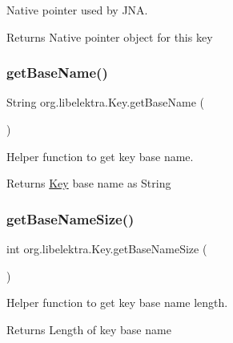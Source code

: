 Native pointer used by J\+NA. 

\begin{DoxyReturn}{Returns}
Native pointer object for this key 
\end{DoxyReturn}
\mbox{\label{classorg_1_1libelektra_1_1Key_a32c556682f808bbc0a4b676879f6b86f}} 
\subsubsection{\texorpdfstring{getBaseName()}{getBaseName()}}
{\footnotesize\ttfamily String org.\+libelektra.\+Key.\+get\+Base\+Name (\begin{DoxyParamCaption}{ }\end{DoxyParamCaption})\hspace{0.3cm}{\ttfamily [inline]}}



Helper function to get key base name. 

\begin{DoxyReturn}{Returns}
\mbox{\hyperlink{classorg_1_1libelektra_1_1Key}{Key}} base name as String 
\end{DoxyReturn}
\mbox{\label{classorg_1_1libelektra_1_1Key_a24bd83bcae08b956150d8ae3dafe738e}} 
\subsubsection{\texorpdfstring{getBaseNameSize()}{getBaseNameSize()}}
{\footnotesize\ttfamily int org.\+libelektra.\+Key.\+get\+Base\+Name\+Size (\begin{DoxyParamCaption}{ }\end{DoxyParamCaption})\hspace{0.3cm}{\ttfamily [inline]}}



Helper function to get key base name length. 

\begin{DoxyReturn}{Returns}
Length of key base name 
\end{DoxyReturn}
\mbox{\label{classorg_1_1libelektra_1_1Key_a9841edcf6c48799c77d8db3b82189abc}} 
